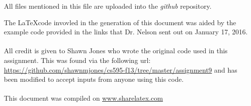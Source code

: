 \documentclass[12pt,letterpaper]{article}
\begin{document}
All files mentioned in this file are uploaded into the {\it github} repository.

The \LaTeX code invovled in the generation of this document was aided by the example code provided in the links that Dr. Nelson sent out on January 17, 2016\cite{mohammedaturban2013}. \\\\
All credit is given to Shawn Jones who wrote the original code used in this assignment\cite{shawnjones2013}. This was found via the following url:  \url{https://github.com/shawnmjones/cs595-f13/tree/master/assignment9} and has been modified to accept inputs from anyone using this code. \\ \\ 

This document was compiled on \url{www.sharelatex.com} \\ \\ 
\end{document}
